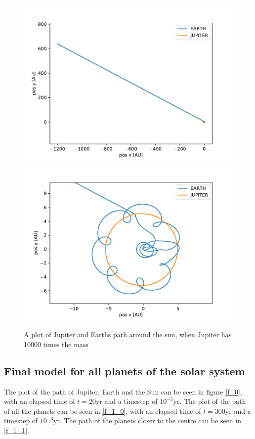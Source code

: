 \documentclass[a4paper]{article}
\begin{document}
	\begin{figure}[h!]
		\centering 
		\includegraphics[scale=0.56]{../opp_e1000.pdf}
		\includegraphics[scale=0.56]{../opp_e1000-0.pdf}
		\caption{A plot of Jupiter and Earths path around the sun, when Jupiter has 10000 times the mass}
		\label{e_1000}
	\end{figure}
	
	\subsection{Final model for all planets of the solar system}
	The plot of the path of Jupiter, Earth and the Sun can be seen in figure \ref{f_0}, with an elapsed time of $t=20\text{yr}$ and a timestep of $10^{-5} \text{yr}$. The plot of the path of all the planets can be seen in \ref{f_1_0}, with an elapsed time of $t=300\text{yr}$ and a timestep of $10^{-3} \text{yr}$. The path of the planets closer to the centre can be seen in \ref{f_1_1}.
	
\end{document}

